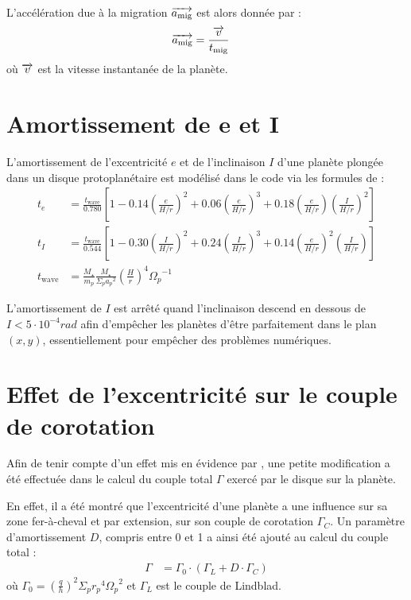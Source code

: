L'accélération due à la migration ${\overrightarrow{a_\text{mig}}}$ est alors donnée par :
\begin{align}
{\overrightarrow{a_\text{mig}}} &= \frac{{\overrightarrow{v}}}{t_\text{mig}}
\end{align}
où ${\overrightarrow{v}}$ est la vitesse instantanée de la planète.

\section{Amortissement de e et I}
L'amortissement de l'excentricité $e$ et de l'inclinaison $I$ d'une planète plongée dans un disque protoplanétaire est modélisé
dans le code via les formules de \cite[eq. (9), (11) et (12)]{cresswell2008three} : 
\begin{subequations}
\begin{align}
t_e &= \frac{t_\text{wave}}{0.780}\left[1-0.14\left(\frac{e}{H/r}\right)^2 + 0.06 \left(\frac{e}{H/r}\right)^3 + 0.18\left(\frac{e}{H/r}\right)\left(\frac{I}{H/r}\right)^2\right]\\
t_I &= \frac{t_\text{wave}}{0.544}\left[1-0.30\left(\frac{I}{H/r}\right)^2 + 0.24 \left(\frac{I}{H/r}\right)^3 + 0.14\left(\frac{e}{H/r}\right)^2\left(\frac{I}{H/r}\right)\right]\\
t_\text{wave} &= \frac{M_\star}{m_p}\frac{M_\star}{\Sigma_p {a_p}^2}\left(\frac{H}{r}\right)^4{\Omega_p}^{-1}
\end{align}
\end{subequations}

L'amortissement de $I$ est arrêté quand l'inclinaison descend en dessous de $I<5\cdot 10^{-4}\unit{rad}$ afin d'empêcher les planètes d'être parfaitement dans le plan $(x,y)$, essentiellement pour empêcher des problèmes numériques.

\section{Effet de l'excentricité sur le couple de corotation}
Afin de tenir compte d'un effet mis en évidence par \cite{bitsch2010orbital}, une petite modification a été effectuée dans le calcul du couple total $\Gamma$ exercé par le disque sur la planète. 

En effet, il a été montré que l'excentricité d'une planète a une influence sur sa zone fer-à-cheval et par extension, sur son couple de corotation $\Gamma_C$. Un paramètre d'amortissement $D$, compris entre 0 et 1 a ainsi été ajouté au calcul du couple total \citep{hellary2012global} :
\begin{align}
\Gamma &= \Gamma_0 \cdot (\Gamma_L + D\cdot \Gamma_C)
\end{align}
où $\Gamma_0 = \left(\frac{q}{h}\right)^2\Sigma_p {r_p}^4 {\Omega_p}^2$ et $\Gamma_L$ est le couple de Lindblad.

